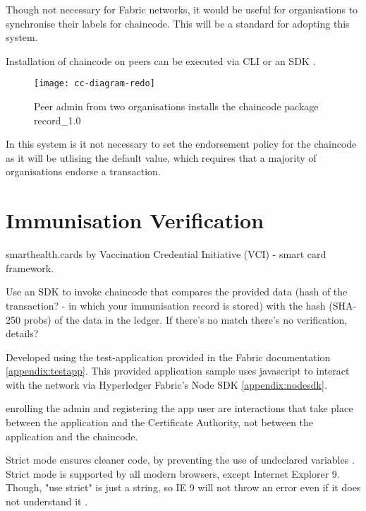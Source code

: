 Though not necessary for Fabric networks, it would be useful for organisations to synchronise their labels for chaincode. This will be a standard for adopting this system.

Installation of chaincode on peers can be executed via CLI or an SDK \cite{noauthor_fabric_nodate}. %

\begin{figure}[H]
  \texttt{[image: cc-diagram-redo]}
  \caption{Peer admin from two organisations installs the chaincode package record\_1.0}
\end{figure}

In this system is it not necessary to set the endorsement policy for the chaincode as it will be utlising the default value, which requires that a majority of organisations endorse a transaction. \cite{noauthor_fabric_nodate}

\section{Immunisation Verification}
smarthealth.cards by Vaccination Credential Initiative (VCI) - smart card framework.\linebreak[1]

Use an SDK to invoke chaincode that compares the provided data (hash of the transaction? - in which your immunisation record is stored) with the hash (SHA-250 probs) of the data in the ledger. If there's no match there's no verification, details?

Developed using the test-application provided in the Fabric documentation \ref{appendix:testapp}. 
This provided application sample uses javascript to interact with the network via Hyperledger Fabric's Node SDK \ref{appendix:nodesdk}. %

enrolling the admin and registering the app user are interactions that take place between the application and the Certificate Authority, not between the application and the chaincode. %

Strict mode ensures cleaner code, by preventing the use of undeclared variables \cite{noauthor_referenceerror_nodate}. 
Strict mode is supported by all modern browsers, except Internet Explorer 9. Though, "use strict" is just a string, so IE 9 will not throw an error even if it does not understand it \cite{noauthor_javascript_nodate}.

